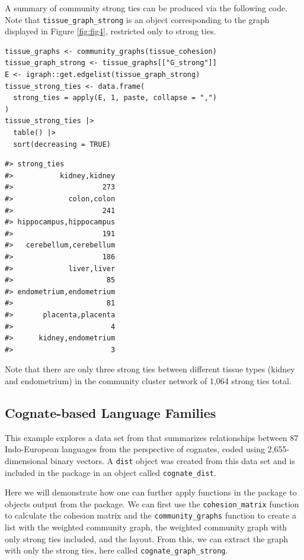A summary of community strong ties can be produced via the following code. Note that \texttt{tissue\_graph\_strong} is an  object corresponding to the graph displayed in Figure \ref{fig:fig4}, restricted only to strong ties.

\begin{verbatim}
tissue_graphs <- community_graphs(tissue_cohesion)
tissue_graph_strong <- tissue_graphs[["G_strong"]]
E <- igraph::get.edgelist(tissue_graph_strong)
tissue_strong_ties <- data.frame(
  strong_ties = apply(E, 1, paste, collapse = ",")
)
tissue_strong_ties |>
  table() |>
  sort(decreasing = TRUE)
\end{verbatim}

\begin{verbatim}
#> strong_ties
#>           kidney,kidney
#>                     273
#>             colon,colon
#>                     241
#> hippocampus,hippocampus
#>                     191
#>   cerebellum,cerebellum
#>                     186
#>             liver,liver
#>                      85
#> endometrium,endometrium
#>                      81
#>       placenta,placenta
#>                       4
#>      kidney,endometrium
#>                       3
\end{verbatim}

Note that there are only three strong ties between different tissue types (kidney and endometrium) in the community cluster network of 1,064 strong ties total.

\hypertarget{cognate-based-language-families}{%
\subsection{Cognate-based Language Families}\label{cognate-based-language-families}}

This example explores a data set from \citet{dyen92} that summarizes relationships between 87 Indo-European languages from the perspective of cognates, coded using 2,655-dimensional binary vectors. A \texttt{dist} object was created from this data set and is included in the  package in an object called \texttt{cognate\_dist}.

Here we will demonstrate how one can further apply functions in the  package to objects output from the  package. We can first use the \texttt{cohesion\_matrix} function to calculate the cohesion matrix and the \texttt{community\_graphs} function to create a list with the weighted community graph, the weighted community graph with only strong ties included, and the layout. From this, we can extract the graph with only the strong ties, here called \texttt{cognate\_graph\_strong}.


